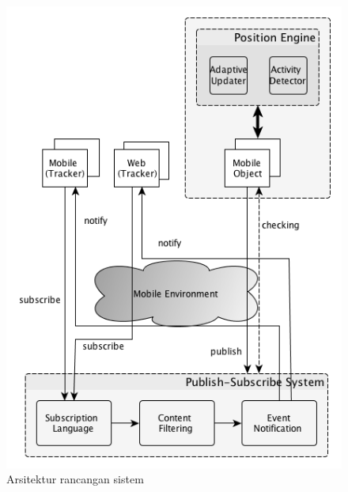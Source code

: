 \noindent
\begin{figure}
    \centering
    \includegraphics[scale=0.80]
        {pics/sistem.png}
    \caption{Arsitektur rancangan sistem}
\label{fig:sistem}
\end{figure}


